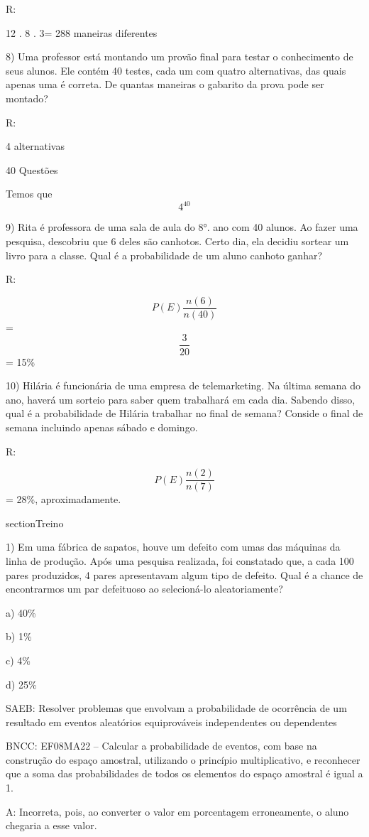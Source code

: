 R:

12 . 8 . 3= 288 maneiras diferentes

8) Uma professor está montando um provão final para testar o
conhecimento de seus alunos. Ele contém 40 testes, cada um com quatro
alternativas, das quais apenas uma é correta. De quantas maneiras o
gabarito da prova pode ser montado?

R:

4 alternativas

40 Questões

Temos que \[4^{40}\]

9) Rita é professora de uma sala de aula do 8°. ano com 40 alunos. Ao
fazer uma pesquisa, descobriu que 6 deles são canhotos. Certo dia, ela
decidiu sortear um livro para a classe. Qual é a probabilidade de um
aluno canhoto ganhar?

R:

\[P(E)\frac{n(6)}{n(40)}\] = \[\frac{3}{20}\] = 15\%

10) Hilária é funcionária de uma empresa de telemarketing. Na última
semana do ano, haverá um sorteio para saber quem trabalhará em cada dia.
Sabendo disso, qual é a probabilidade de Hilária trabalhar no final de
semana? Conside o final de semana incluindo apenas sábado e domingo.

R:

\[P(E)\frac{n(2)}{n(7)}\] = 28\%, aproximadamente.

section{Treino}

1) Em uma fábrica de sapatos, houve um defeito com umas das máquinas da
linha de produção. Após uma pesquisa realizada, foi constatado que, a
cada 100 pares produzidos, 4 pares apresentavam algum tipo de defeito.
Qual é a chance de encontrarmos um par defeituoso ao selecioná-lo
aleatoriamente?

a) 40\%

b) 1\%

c) 4\%

d) 25\%

SAEB: Resolver problemas que envolvam a probabilidade de ocorrência de
um resultado em eventos aleatórios equiprováveis independentes ou
dependentes

BNCC: EF08MA22 -- Calcular a probabilidade de eventos, com base na
construção do espaço amostral, utilizando o princípio multiplicativo, e
reconhecer que a soma das probabilidades de todos os elementos do espaço
amostral é igual a 1.

A: Incorreta, pois, ao converter o valor em porcentagem erroneamente, o
aluno chegaria a esse valor.

